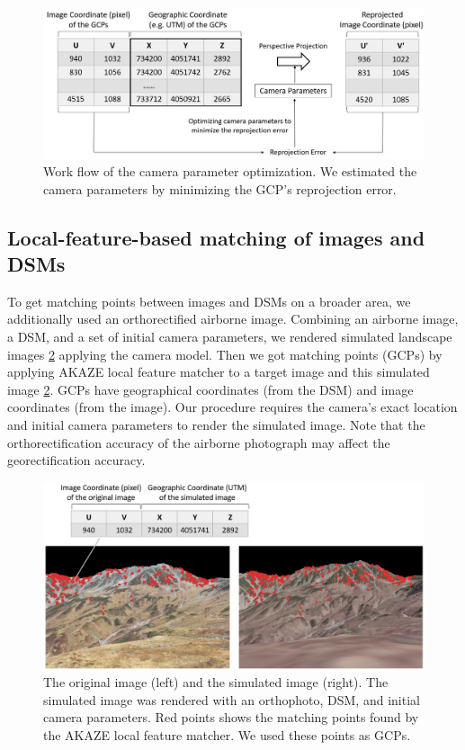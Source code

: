 \documentclass{article}
\begin{document}
\begin{figure}
\includegraphics[width=1\linewidth]{paper_files/figures/Slide5} \caption{Work flow of the camera parameter optimization. We estimated the camera parameters by minimizing the GCP's reprojection error.}\label{fig:optim}
\end{figure}

\hypertarget{local-feature-based-matching-of-images-and-dsms}{%
\subsection{Local-feature-based matching of images and DSMs}\label{local-feature-based-matching-of-images-and-dsms}}

To get matching points between images and DSMs on a broader area, we additionally used an orthorectified airborne image. Combining an airborne image, a DSM, and a set of initial camera parameters, we rendered simulated landscape images \ref{fig:matched} applying the camera model. Then we got matching points (GCPs) by applying AKAZE local feature matcher to a target image and this simulated image \ref{fig:matched}. GCPs have geographical coordinates (from the DSM) and image coordinates (from the image). Our procedure requires the camera's exact location and initial camera parameters to render the simulated image. Note that the orthorectification accuracy of the airborne photograph may affect the georectification accuracy.



\begin{figure}
\includegraphics[width=1\linewidth]{paper_files/figures/Slide4} \caption{The original image (left) and the simulated image (right). The simulated image was rendered with an orthophoto, DSM, and initial camera parameters. Red points shows the matching points found by the AKAZE local feature matcher. We used these points as GCPs.}\label{fig:matched}
\end{figure}
\end{document}
